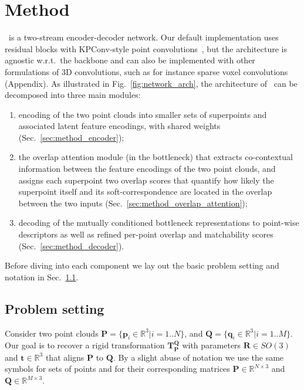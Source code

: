 \section{Method}
\label{sec:method}

\acro\ is a two-stream encoder-decoder network. Our default implementation uses residual blocks with KPConv-style point convolutions~\cite{thomas2019kpconv}, but the architecture is agnostic w.r.t.\ the backbone and can also be implemented with other formulations of 3D convolutions, such as for instance sparse voxel convolutions~\cite{choy2019Minkowski} (\cf Appendix). 
As illustrated in Fig.~\ref{fig:network_arch}, the architecture of \acro\ can be decomposed into three main modules:
\begin{enumerate}
\item encoding of the two point clouds into smaller sets of superpoints and associated latent feature encodings, with shared weights (Sec.~\ref{sec:method_encoder});
\item the overlap attention module (in the bottleneck) that extracts co-contextual information between the feature encodings of the two point clouds, and assigns each superpoint two overlap scores that quantify how likely the superpoint itself and its soft-correspondence are located in the overlap between the two inputs (Sec.~\ref{sec:method_overlap_attention}); 
\item decoding of the mutually conditioned bottleneck representations to point-wise descriptors as well as refined per-point overlap and matchability scores (Sec.~\ref{sec:method_decoder}).
\end{enumerate}
Before diving into each component we lay out the basic problem setting and notation in Sec.~\ref{sec:method_notation}. %
\subsection{Problem setting}
\label{sec:method_notation}

Consider two point clouds $\mathbf{P}= \{\mathbf{p}_i \in \mathbb{R}^3| i = 1..N\}$, and $\mathbf{Q}= \{\mathbf{q}_i \in \mathbb{R}^3| i = 1..M\}$.
Our goal is to recover a rigid transformation $\mathbf{T}_\mathbf{P}^\mathbf{Q}$ with parameters $\mathbf{R} \in SO(3)$ and $\mathbf{t} \in \mathbb{R}^3$ that aligns %
$\mathbf{P}$ to $\mathbf{Q}$.
By a slight abuse of notation we use the same symbols for sets of points and for their corresponding matrices $\mathbf{P}\in\mathbb{R}^{N\times 3}$ and $\mathbf{Q}\in\mathbb{R}^{M\times 3}$.

